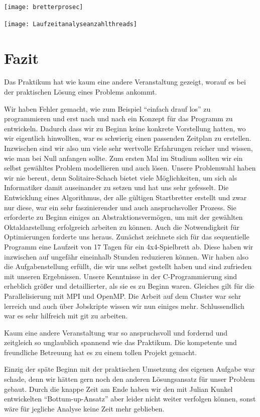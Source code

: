 \documentclass[
	12pt,
	a4paper,
	BCOR10mm,
	DIV14,
	listof=totoc,
	bibliography=totoc,
	headsepline
]{scrreprt}
\begin{document}
\texttt{[image: bretterprosec]}

\texttt{[image: Laufzeitanalyseanzahlthreads]}




\chapter{Fazit}
\label{Fazit}


Das Praktikum hat wie kaum eine andere Veranstaltung gezeigt, worauf es bei der praktischen Lösung eines Problems ankommt.

Wir haben Fehler gemacht, wie zum Beispiel "`einfach drauf los"' zu programmieren und erst nach und nach ein Konzept für das Programm zu entwickeln. Dadurch dass wir zu Beginn keine konkrete Vorstellung hatten, wo wir eigentlich hinwollten, war es schwierig einen passenden Zeitplan zu erstellen. 
Inzwischen sind wir also um viele sehr wertvolle Erfahrungen reicher und wissen, wie man bei Null anfangen sollte. 
Zum ersten Mal im Studium sollten wir ein selbst gewähltes Problem modellieren und auch lösen.
Unsere Problemwahl haben wir nie bereut, denn Solitaire-Schach bietet viele Möglichkeiten, um sich als Informatiker damit auseinander zu setzen und hat uns sehr gefesselt.
Die Entwicklung eines Algorithmus, der alle gültigen Startbretter erstellt und zwar nur diese, war ein sehr faszinierender und auch anspruchsvoller Prozess. Sie erforderte zu Beginn einiges an Abstraktionsvermögen, um mit der gewählten Oktaldarstellung erfolgreich arbeiten zu können.
Auch die Notwendigkeit für Optimierungen forderte uns heraus. Zunächst zeichnete sich für das sequentielle Programm eine Laufzeit von 17 Tagen für ein 4x4-Spielbrett ab. 
Diese haben wir inzwischen auf ungefähr eineinhalb Stunden reduzieren können. 
Wir haben also die Aufgabenstellung erfüllt, die wir uns selbst gestellt haben und sind zufrieden mit unseren Ergebnissen.
Unsere Kenntnisse in der C-Programmierung sind erheblich größer und detaillierter, als sie es zu Beginn waren. Gleiches gilt für die Parallelisierung mit MPI und OpenMP.
Die Arbeit auf dem Cluster war sehr lerreich und auch über Jobskripte wissen wir nun einiges mehr. Schlussendlich war es sehr hilfreich mit git zu arbeiten.

Kaum eine andere Veranstaltung war so anspruchsvoll und fordernd und zeitgleich so unglaublich spannend wie das Praktikum.
Die kompetente und freundliche Betreuung hat es zu einem tollen Projekt gemacht.

Einzig der späte Beginn mit der praktischen Umsetzung des eigenen Aufgabe war schade, denn wir hätten gern noch den anderen Lösungsansatz für unser Problem gebaut.
Durch die knappe Zeit am Ende haben wir den mit Julian Kunkel entwickelten "`Bottum-up-Ansatz"' aber leider nicht weiter verfolgen können, sonst wäre für jegliche Analyse keine Zeit mehr geblieben.
 
\end{document}
